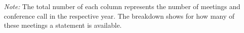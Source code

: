 \documentclass{article}
\begin{document}
\begin{landscape}
	\begin{table}[h!]
		\begin{center}
			
		\end{center}
	\end{table}
\end{landscape}

\begin{landscape}
	\begin{table}[h!]
		\begin{center}
			
		\end{center}
	\end{table}
\end{landscape}

\begin{table}[h!]
	\begin{center}
		
	\end{center}
\footnotesize{\textit{Note:} The total number of each column represents the number of meetings and conference call in the respective year. The breakdown shows for how many of these meetings a statement is available.}
\end{table}
\end{document}
